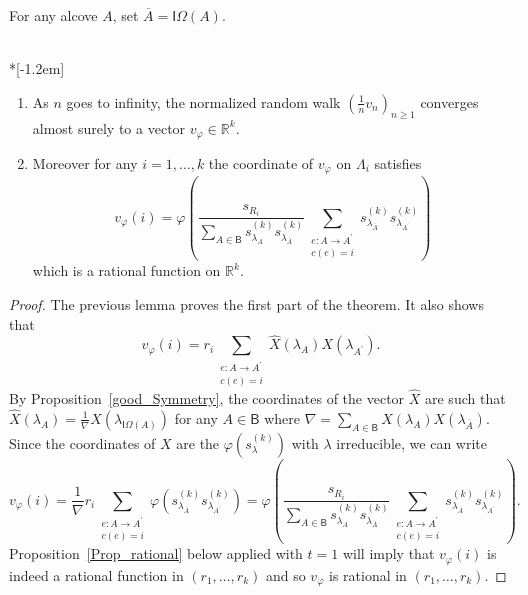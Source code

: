 \documentclass[ALCO,ThmDefs,Unicode,epreuves]{cedram}
\begin{document}

For any alcove $A$, set $\overline{A}=\mathsf{I}\Omega(A)$.

\goodbreak
\begin{theorem}\label{result_drift} \ \\*[-1.2em]

\begin{enumerate}
\item As $n$ goes to infinity, the normalized random walk $\left( \frac{1}%
{n}v_{n}\right) _{n\geq1}$ converges almost surely to a vector $v_{\varphi
}\in\mathbb{R}^{k}$.

\item Moreover for any $i=1,\ldots,k$ the coordinate of $v_{\varphi}$ on
$\Lambda_{i}$ satisfies
\[
v_{\varphi}(i)=\varphi\left( \frac{s_{R_{i}}}{\sum_{A\in\mathsf{B}}%
s_{\lambda_{A}}^{(k)}s_{\lambda_{\overline{A}}}^{(k)}}\sum
_{\substack{e:A\rightarrow A^{\prime}\\c(e)=i}}s_{\lambda_{\overline{A}}%
}^{(k)}s_{\lambda_{A^{\prime}}}^{(k)}\right)
\]
which is a rational function on $\mathbb{R}^{k}$.
\end{enumerate}
\end{theorem}

\begin{proof}
The previous lemma proves the first part of the theorem. It also shows that
\[
v_{\varphi}(i)=r_{i}\sum_{\substack{e:A\rightarrow A^{\prime}\\c(e)=i}%
}\widehat{X}(\lambda_{A})X(\lambda_{A^{\prime}}).
\]
By Proposition~\ref{good_Symmetry}, the coordinates of the vector $\widehat
{X}$ are such that $\widehat{X}(\lambda_{A})=\frac{1}{\nabla}X(\lambda
_{\mathsf{I}\Omega(A)})$ for any $A\in\mathsf{B}$ where $\nabla=\sum
_{A\in\mathsf{B}}X(\lambda_{A})X(\lambda_{\overline{A}})$. Since the
coordinates of $X$ are the $\varphi(s_{\lambda}^{(k)})$ with $\lambda$
irreducible, we can write%
\[
v_{\varphi}(i)=\frac{1}{\nabla}r_{i}\sum_{\substack{e:A\rightarrow A^{\prime
}\\c(e)=i}}\varphi(s_{\lambda_{\overline{A}}}^{(k)}s_{\lambda_{A^{\prime}}%
}^{(k)})=\varphi\left( \frac{s_{R_{i}}}{\sum_{A\in\mathsf{B}}s_{\lambda_{A}%
}^{(k)}s_{\lambda_{\overline{A}}}^{(k)}}\sum_{\substack{e:A\rightarrow
A^{\prime}\\c(e)=i}}s_{\lambda_{\overline{A}}}^{(k)}s_{\lambda_{A^{\prime}}%
}^{(k)}\right) .
\]
Proposition~\ref{Prop_rational} below applied with $t=1$ will imply that
$v_{\varphi}(i)$ is indeed a rational function in $(r_{1},\ldots,r_{k})$ and
so $v_{\varphi}$ is rational in $(r_{1},\ldots,r_{k})$.
\end{proof}
\end{document}

